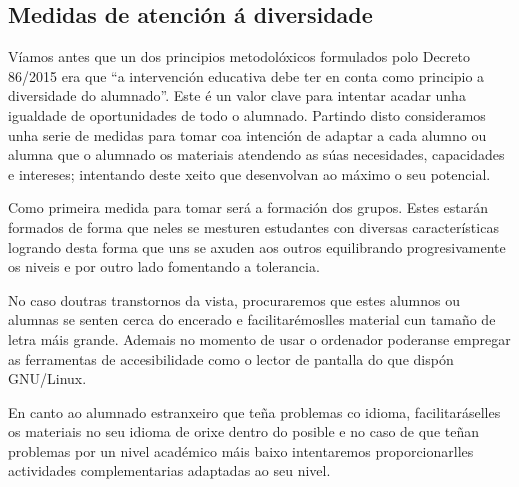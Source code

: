 \subsection{Medidas de atención á diversidade}\label{sec:diversidade}

Víamos antes que un dos principios metodolóxicos formulados polo Decreto 86/2015 era que ``a intervención educativa debe ter en conta como principio a diversidade do alumnado''. Este é un valor clave para intentar acadar unha igualdade de oportunidades de todo o alumnado. Partindo disto consideramos unha serie de medidas para tomar coa intención de adaptar a cada alumno ou alumna que o alumnado os materiais atendendo as súas necesidades, capacidades e intereses; intentando deste xeito que desenvolvan ao máximo o seu potencial.

Como primeira medida para tomar será a formación dos grupos. Estes estarán formados de forma que neles se mesturen estudantes con diversas características logrando desta forma que uns se axuden aos outros equilibrando progresivamente os niveis e por outro lado fomentando a tolerancia.

No caso doutras transtornos da vista, procuraremos que estes alumnos ou alumnas se senten cerca do encerado e facilitarémoslles material cun tamaño de letra máis grande. Ademais no momento de usar o ordenador poderanse empregar as ferramentas de accesibilidade como o lector de pantalla do que dispón GNU/Linux.

En canto ao alumnado estranxeiro que teña problemas co idioma, facilitaráselles os materiais no seu idioma de orixe dentro do posible e no caso de que teñan problemas por un nivel académico máis baixo intentaremos proporcionarlles actividades complementarias adaptadas ao seu nivel.
